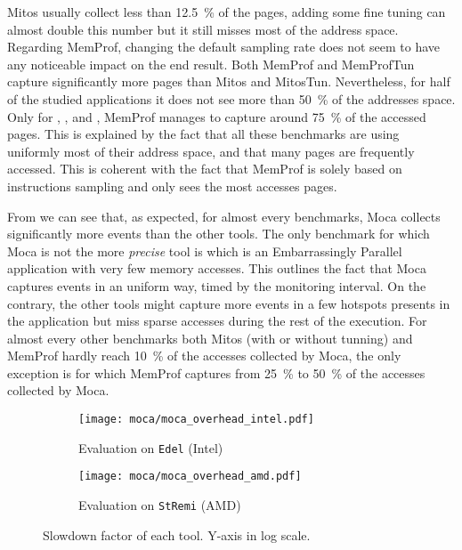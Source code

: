 \gls{Mitos} usually collect less than \SI{12.5}{\%} of the pages, adding some fine tuning can almost double this number but it still misses most of the address space.
Regarding \gls{MemProf}, changing the default sampling rate does not seem to have any noticeable impact on the end result.
Both \gls{MemProf} and MemProfTun capture significantly more pages than \gls{Mitos} and MitosTun.
Nevertheless, for half of the studied applications it does not see more than \SI{50}{\%} of the addresses space.
Only for \BT, \LU, \SP and \UA, \gls{MemProf} manages to capture around \SI{75}{\%} of the accessed pages.
This is explained by the fact that all these benchmarks are using uniformly most of their address space, and that many pages are frequently accessed.
This is coherent with the fact that \gls{MemProf} is solely based on instructions sampling and only sees the most accesses pages.

From  we can see that, as expected, for almost every benchmarks, \gls{Moca} collects significantly more events than the other tools.
 The only benchmark for which \gls{Moca} is not the more \emph{precise} tool is \EP which is an Embarrassingly Parallel application with very few memory accesses.
This outlines the fact that \gls{Moca} captures events in an uniform way, timed by the monitoring interval.
On the contrary, the other tools might capture more events in a few hotspots presents in the application but miss sparse accesses during the rest of the execution.
For almost every other benchmarks both \gls{Mitos} (with or without tunning) and \gls{MemProf} hardly reach \SI{10}{\%} of the accesses collected by \gls{Moca}, the only exception is \DC for which \gls{MemProf} captures from \SI{25}{\%} to \SI{50}{\%} of the accesses collected by \gls{Moca}.

\begin{figure}[htb]
    \centering
    \begin{subfigure}{.73\linewidth}
        \texttt{[image: moca/moca\_overhead\_intel.pdf]}
        \caption{Evaluation on \texttt{Edel} (Intel)}
        \label{fig:ovh-moca-Intel}
    \end{subfigure}
    \begin{subfigure}{.73\linewidth}
        \texttt{[image: moca/moca\_overhead\_amd.pdf]}
        \caption{Evaluation on \texttt{StRemi} (AMD)}
        \label{fig:ovh-moca-AMD}
    \end{subfigure}
    \caption[Slowdown factor of each tool.]{Slowdown factor of each tool.
    Y-axis in log scale.}
    \label{fig:ovh-moca}
\end{figure}

